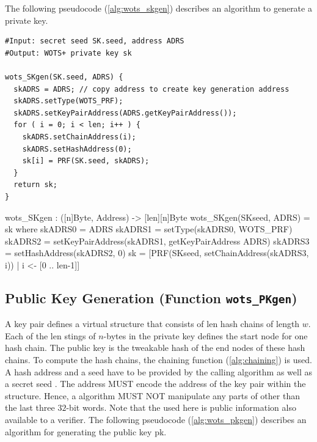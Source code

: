 The following pseudocode (\autoref{alg:wots_skgen}) describes an algorithm 
to generate a \wotsp private key.

\begin{lstlisting}[label=alg:wots_skgen, language=pseudoc,
                   caption=\texttt{wots\_SKgen} -- Generating a \wotsp private key.]
#Input: secret seed SK.seed, address ADRS
#Output: WOTS+ private key sk

wots_SKgen(SK.seed, ADRS) {
  skADRS = ADRS; // copy address to create key generation address
  skADRS.setType(WOTS_PRF);
  skADRS.setKeyPairAddress(ADRS.getKeyPairAddress());
  for ( i = 0; i < len; i++ ) {
    skADRS.setChainAddress(i);
    skADRS.setHashAddress(0);
    sk[i] = PRF(SK.seed, skADRS);
  }
  return sk;
}
\end{lstlisting}

\begin{code}
  wots_SKgen : ([n]Byte, Address) -> [len][n]Byte
  wots_SKgen(SKseed, ADRS) = sk where
    skADRS0 = ADRS
    skADRS1 = setType(skADRS0, WOTS_PRF)
    skADRS2 = setKeyPairAddress(skADRS1, getKeyPairAddress ADRS)
    skADRS3 = setHashAddress(skADRS2, 0)
    sk = [PRF(SKseed, setChainAddress(skADRS3, i)) | i <- [0 .. len-1]]
\end{code}

\subsection{\wotsp Public Key Generation (Function \texttt{wots\_PKgen})}
A \wotsp key pair defines a virtual structure that consists of len hash chains of
length $w$. 
Each of the len stings of $n$-bytes in the private key defines the start
node for one hash chain. The public key is the tweakable hash of the end nodes 
of these hash chains. 
To compute the hash chains, the chaining function
(\autoref{alg:chaining}) is used. A \wotsp hash address \adrs and a seed \pseed have
to be provided by the calling algorithm as well as a secret seed \sseed. 
The address \adrs MUST encode the address of
the \wotsp key pair within the \spx structure. Hence, a \wotsp algorithm MUST NOT
manipulate any parts of \adrs other than the last three $32$-bit words. 
Note that the \pseed used here is public information also available to a verifier.
The following pseudocode (\autoref{alg:wots_pkgen}) describes an algorithm for
generating the public key pk.

